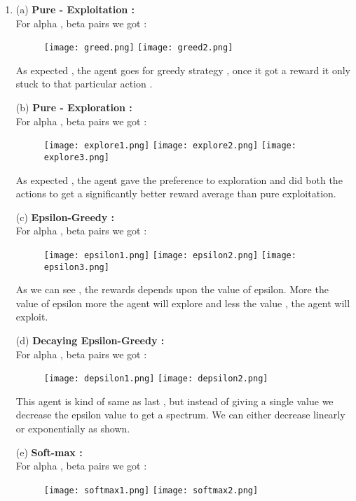 \documentclass[a4 paper]{article}
\begin{document}
\begin{enumerate}
\item (a) \textbf{Pure - Exploitation :} \\
For alpha , beta pairs  we got : 
\begin{figure}[h!]
    \centering
    \texttt{[image: greed.png]}
    \texttt{[image: greed2.png]}
\end{figure}

As expected , the agent goes for greedy strategy , once it got a reward it only stuck to that particular action .

(b) \textbf{Pure - Exploration :} \\
For alpha , beta pairs  we got : 
\begin{figure}[h!]
    \centering
    \texttt{[image: explore1.png]}
    \texttt{[image: explore2.png]}
    \texttt{[image: explore3.png]}
\end{figure}

As expected , the agent gave the preference to exploration and did both the actions to get a significantly better reward average than pure exploitation.

(c) \textbf{Epsilon-Greedy :} \\
For alpha , beta pairs  we got : 
\begin{figure}[h!]
    \centering
    \texttt{[image: epsilon1.png]}
    \texttt{[image: epsilon2.png]}
    \texttt{[image: epsilon3.png]}
\end{figure}

As we can see , the rewards depends upon the value of epsilon. More the value of epsilon more the agent will explore and less the value , the agent will exploit.

(d) \textbf{Decaying Epsilon-Greedy :} \\
For alpha , beta pairs  we got : 
\begin{figure}[h!]
    \centering
    \texttt{[image: depsilon1.png]}
    \texttt{[image: depsilon2.png]}
\end{figure}

This agent is kind of same as last , but instead of giving a single value we decrease the epsilon value to get a spectrum. We can either decrease linearly or exponentially as shown.

(e) \textbf{ Soft-max :} \\
For alpha , beta pairs  we got : 
\begin{figure}[h!]
    \centering
    \texttt{[image: softmax1.png]}
    \texttt{[image: softmax2.png]}
\end{figure}


\end{enumerate}
\end{document}
